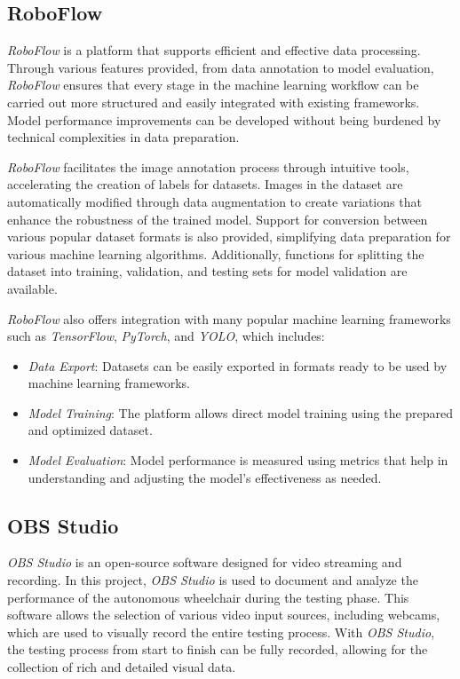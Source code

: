 \subsection{RoboFlow}
\label{subsec:RoboFlow}

\emph{RoboFlow} is a platform that supports efficient and effective data processing. Through various features provided, from data annotation to model evaluation, \emph{RoboFlow} ensures that every stage in the machine learning workflow can be carried out more structured and easily integrated with existing frameworks. Model performance improvements can be developed without being burdened by technical complexities in data preparation.

\emph{RoboFlow} facilitates the image annotation process through intuitive tools, accelerating the creation of labels for datasets. Images in the dataset are automatically modified through data augmentation to create variations that enhance the robustness of the trained model. Support for conversion between various popular dataset formats is also provided, simplifying data preparation for various machine learning algorithms. Additionally, functions for splitting the dataset into training, validation, and testing sets for model validation are available.

\emph{RoboFlow} also offers integration with many popular machine learning frameworks such as \emph{TensorFlow}, \emph{PyTorch}, and \emph{YOLO}, which includes:

\begin{itemize}
    \item \emph{Data Export}: Datasets can be easily exported in formats ready to be used by machine learning frameworks.
    \item \emph{Model Training}: The platform allows direct model training using the prepared and optimized dataset.
    \item \emph{Model Evaluation}: Model performance is measured using metrics that help in understanding and adjusting the model's effectiveness as needed.
\end{itemize}

\subsection{OBS Studio}
\label{subsec:OBS Studio}

\emph{OBS Studio} is an open-source software designed for video streaming and recording. In this project, \emph{OBS Studio} is used to document and analyze the performance of the autonomous wheelchair during the testing phase. This software allows the selection of various video input sources, including webcams, which are used to visually record the entire testing process. With \emph{OBS Studio}, the testing process from start to finish can be fully recorded, allowing for the collection of rich and detailed visual data.

